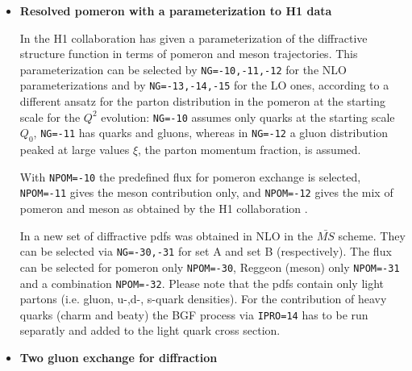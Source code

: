 \documentclass[10pt]{article} \usepackage{dina4}
\begin{document}
\begin{itemize}
\item {\bf Resolved pomeron with a parameterization to
H1 data} 

In \cite{H1_F2D3_97} the H1 collaboration has given a parameterization of the
diffractive structure function in terms of pomeron and meson trajectories. This 
parameterization can be selected by \verb+NG=-10,-11,-12+
for the NLO parameterizations and by \verb+NG=-13,-14,-15+
for the LO ones, according to a 
different ansatz for the parton distribution in the pomeron at the starting
scale for the $Q^2$ evolution: \verb+NG=-10+ assumes only quarks at the starting
scale $Q_0$, \verb+NG=-11+ has quarks and gluons, whereas in \verb+NG=-12+ 
a gluon distribution peaked at large values $\xi$, the parton momentum
fraction, is assumed.
\par
With \verb+NPOM=-10+  the predefined flux for pomeron exchange is selected,
\verb+NPOM=-11+ gives the meson contribution only, and \verb+NPOM=-12+ gives the
mix of pomeron and meson as obtained by the H1 collaboration \cite{H1_F2D3_97}.

In \cite{H1_F2D3_06} a new set of diffractive pdfs was obtained in NLO in the
$\bar{MS}$ scheme. They can be selected via \verb+NG=-30,-31+ for set A and set
B (respectively). The flux can be selected for pomeron only \verb+NPOM=-30+,
Reggeon (meson) only \verb+NPOM=-31+ and a combination \verb+NPOM=-32+. Please
note that the pdfs contain only light partons (i.e. gluon, u-,d-, s-quark
densities). For the contribution of heavy quarks (charm and beaty) the BGF
process via  \verb+IPRO=14+ has to be run separatly and added to the light quark
cross section.
 
\item {\bf Two gluon exchange for diffraction} 


\end{itemize}
\end{document}
